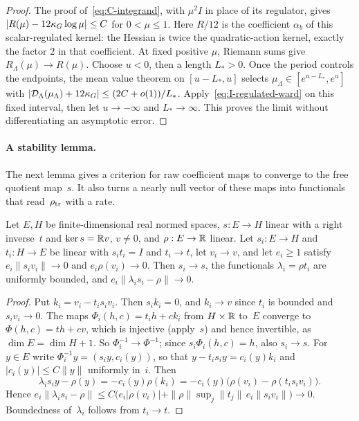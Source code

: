 \begin{proof}
The proof of~\eqref{eq:C-integrand}, with $\mu^2I$ in place of its regulator, gives $|R(\mu)-12\kappa_G\log\mu|\le C$ for $0<\mu\le1$. Here $R/12$ is the coefficient $\alpha_b$ of this scalar-regulated kernel: the Hessian is twice the quadratic-action kernel, exactly the factor $2$ in that coefficient. At fixed positive $\mu$, Riemann sums give $R_\Lambda(\mu)\to R(\mu)$. Choose $u<0$, then a length $L_*>0$. Once the period controls the endpoints, the mean value theorem on $[u-L_*,u]$ selects $\mu_\Lambda\in[e^{u-L_*},e^u]$ with $|\mathcal D_\Lambda(\mu_\Lambda)+12\kappa_G|\le(2C+o(1))/L_*$. Apply~\eqref{eq:I-regulated-ward} on this fixed interval, then let $u\to-\infty$ and $L_*\to\infty$. This proves the limit without differentiating an asymptotic error.
\end{proof}

\paragraph{A stability lemma.}
The next lemma gives a criterion for raw coefficient maps to converge to the free quotient map~$s$. It also turns a nearly null vector of these maps into functionals that read~$\rho_{\rm tr}$ with a rate.
\begin{lemma}\label{lem:I-stability}
Let $E,H$ be finite-dimensional real normed spaces, $s:E\to H$ linear with a right inverse~$t$ and $\ker s=\mathbb{R} v$, $v\ne0$, and $\rho:E\to\mathbb{R}$ linear. Let $s_i:E\to H$ and $t_i:H\to E$ be linear with $s_it_i=I$ and $t_i\to t$, let $v_i\to v$, and let $e_i\ge1$ satisfy $e_i\|s_iv_i\|\to0$ and $e_i\rho(v_i)\to0$. Then $s_i\to s$, the functionals $\lambda_i=\rho t_i$ are uniformly bounded, and $e_i\|\lambda_is_i-\rho\|\to0$.
\end{lemma}
\begin{proof}
Put $k_i=v_i-t_is_iv_i$. Then $s_ik_i=0$, and $k_i\to v$ since $t_i$ is bounded and $s_iv_i\to0$. The maps $\Phi_i(h,c)=t_ih+ck_i$ from $H\times\mathbb{R}$ to~$E$ converge to $\Phi(h,c)=th+cv$, which is injective (apply~$s$) and hence invertible, as $\dim E=\dim H+1$. So $\Phi_i^{-1}\to\Phi^{-1}$; since $s_i\Phi_i(h,c)=h$, also $s_i\to s$. For $y\in E$ write $\Phi_i^{-1}y=(s_iy,c_i(y))$, so that $y-t_is_iy=c_i(y)k_i$ and $|c_i(y)|\le C\|y\|$ uniformly in~$i$. Then
\begin{equation*}
\lambda_is_iy-\rho(y)=-c_i(y)\rho(k_i)=-c_i(y)\bigl(\rho(v_i)-\rho(t_is_iv_i)\bigr).
\end{equation*}
Hence $e_i\|\lambda_is_i-\rho\|\le C\bigl(e_i|\rho(v_i)|+\|\rho\|\sup_j\|t_j\|\,e_i\|s_iv_i\|\bigr)\to0$. Boundedness of~$\lambda_i$ follows from $t_i\to t$.
\end{proof}


